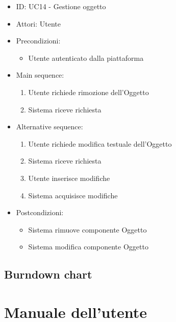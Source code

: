 \documentclass{article}
\begin{document}
\begin{itemize}[label = {-}]
    \itemsep0px
    \item ID: UC14 - Gestione oggetto
    \item Attori: Utente
    \item Precondizioni: 
        \begin{itemize}[label = {-}]
            \item Utente autenticato dalla piattaforma
        \end{itemize}
    \item Main sequence: 
        \begin{enumerate}
            \item Utente richiede rimozione dell'Oggetto
            \item Sistema riceve richiesta
        \end{enumerate}
    \item Alternative sequence:
        \begin{enumerate}
            \item Utente richiede modifica testuale dell'Oggetto
            \item Sistema riceve richiesta
            \item Utente inserisce modifiche
            \item Sistema acquisisce modifiche
        \end{enumerate}
    \item Postcondizioni: 
        \begin{itemize}[label = {-}]
            \item Sistema rimuove componente Oggetto
            \item Sistema modifica componente Oggetto
        \end{itemize}
\end{itemize}

\newpage
\subsection{Burndown chart}

\newpage
\section{Manuale dell'utente}
\end{document}
